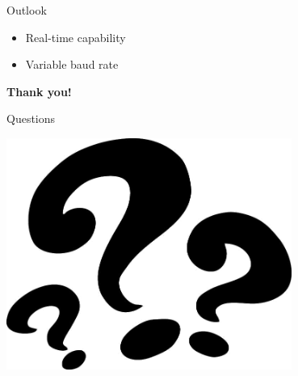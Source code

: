 \documentclass{beamer}
\begin{document}
\begin{frame}{Outlook}
\begin{center}
    \begin{itemize}
      \item Real-time capability
      \item Variable baud rate
    \end{itemize}
\end{center}
\end{frame}


\begin{frame}
\begin{center}
\begin{Huge}\textbf{Thank you!}\end{Huge}
\end{center}
\end{frame}


\begin{frame}{Questions}
\begin{center}
\includegraphics[width=0.7\textwidth]{./images/question-marks.png}
\end{center}
\end{frame}
\end{document}
